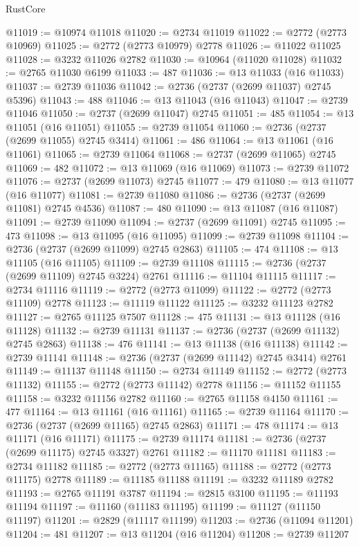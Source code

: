 \begin{lexlean}{RustCore}
\begin{coremodule}
@11019 := @10974 @11018
@11020 := @2734 @11019
@11022 := @2772 (@2773 @10969)
@11025 := @2772 (@2773 @10979) @2778
@11026 := @11022 @11025
@11028 := @3232 @11026 @2782
@11030 := @10964 (@11020 @11028)
@11032 := @2765 @11030 @6199
@11033 := 487
@11036 := @13 @11033 (@16 @11033)
@11037 := @2739 @11036
@11042 := @2736 (@2737 (@2699 @11037) @2745 @5396)
@11043 := 488
@11046 := @13 @11043 (@16 @11043)
@11047 := @2739 @11046
@11050 := @2737 (@2699 @11047) @2745
@11051 := 485
@11054 := @13 @11051 (@16 @11051)
@11055 := @2739 @11054
@11060 := @2736 (@2737 (@2699 @11055) @2745 @3414)
@11061 := 486
@11064 := @13 @11061 (@16 @11061)
@11065 := @2739 @11064
@11068 := @2737 (@2699 @11065) @2745
@11069 := 482
@11072 := @13 @11069 (@16 @11069)
@11073 := @2739 @11072
@11076 := @2737 (@2699 @11073) @2745
@11077 := 479
@11080 := @13 @11077 (@16 @11077)
@11081 := @2739 @11080
@11086 := @2736 (@2737 (@2699 @11081) @2745 @4536)
@11087 := 480
@11090 := @13 @11087 (@16 @11087)
@11091 := @2739 @11090
@11094 := @2737 (@2699 @11091) @2745
@11095 := 473
@11098 := @13 @11095 (@16 @11095)
@11099 := @2739 @11098
@11104 := @2736 (@2737 (@2699 @11099) @2745 @2863)
@11105 := 474
@11108 := @13 @11105 (@16 @11105)
@11109 := @2739 @11108
@11115 := @2736 (@2737 (@2699 @11109) @2745 @3224) @2761
@11116 := @11104 @11115
@11117 := @2734 @11116
@11119 := @2772 (@2773 @11099)
@11122 := @2772 (@2773 @11109) @2778
@11123 := @11119 @11122
@11125 := @3232 @11123 @2782
@11127 := @2765 @11125 @7507
@11128 := 475
@11131 := @13 @11128 (@16 @11128)
@11132 := @2739 @11131
@11137 := @2736 (@2737 (@2699 @11132) @2745 @2863)
@11138 := 476
@11141 := @13 @11138 (@16 @11138)
@11142 := @2739 @11141
@11148 := @2736 (@2737 (@2699 @11142) @2745 @3414) @2761
@11149 := @11137 @11148
@11150 := @2734 @11149
@11152 := @2772 (@2773 @11132)
@11155 := @2772 (@2773 @11142) @2778
@11156 := @11152 @11155
@11158 := @3232 @11156 @2782
@11160 := @2765 @11158 @4150
@11161 := 477
@11164 := @13 @11161 (@16 @11161)
@11165 := @2739 @11164
@11170 := @2736 (@2737 (@2699 @11165) @2745 @2863)
@11171 := 478
@11174 := @13 @11171 (@16 @11171)
@11175 := @2739 @11174
@11181 := @2736 (@2737 (@2699 @11175) @2745 @3327) @2761
@11182 := @11170 @11181
@11183 := @2734 @11182
@11185 := @2772 (@2773 @11165)
@11188 := @2772 (@2773 @11175) @2778
@11189 := @11185 @11188
@11191 := @3232 @11189 @2782
@11193 := @2765 @11191 @3787
@11194 := @2815 @3100
@11195 := @11193 @11194
@11197 := @11160 (@11183 @11195)
@11199 := @11127 (@11150 @11197)
@11201 := @2829 (@11117 @11199)
@11203 := @2736 (@11094 @11201)
@11204 := 481
@11207 := @13 @11204 (@16 @11204)
@11208 := @2739 @11207

\end{coremodule}
\end{lexlean}
